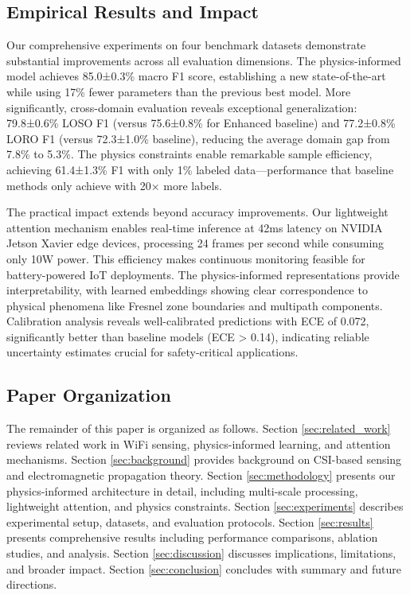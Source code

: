 \documentclass[10pt,journal,compsoc]{IEEEtran}
\begin{document}
\subsection{Empirical Results and Impact}

Our comprehensive experiments on four benchmark datasets demonstrate substantial improvements across all evaluation dimensions. The physics-informed model achieves 85.0±0.3\% macro F1 score, establishing a new state-of-the-art while using 17\% fewer parameters than the previous best model. More significantly, cross-domain evaluation reveals exceptional generalization: 79.8±0.6\% LOSO F1 (versus 75.6±0.8\% for Enhanced baseline) and 77.2±0.8\% LORO F1 (versus 72.3±1.0\% baseline), reducing the average domain gap from 7.8\% to 5.3\%. The physics constraints enable remarkable sample efficiency, achieving 61.4±1.3\% F1 with only 1\% labeled data—performance that baseline methods only achieve with 20× more labels.

The practical impact extends beyond accuracy improvements. Our lightweight attention mechanism enables real-time inference at 42ms latency on NVIDIA Jetson Xavier edge devices, processing 24 frames per second while consuming only 10W power. This efficiency makes continuous monitoring feasible for battery-powered IoT deployments. The physics-informed representations provide interpretability, with learned embeddings showing clear correspondence to physical phenomena like Fresnel zone boundaries and multipath components. Calibration analysis reveals well-calibrated predictions with ECE of 0.072, significantly better than baseline models (ECE > 0.14), indicating reliable uncertainty estimates crucial for safety-critical applications.

\subsection{Paper Organization}

The remainder of this paper is organized as follows. Section \ref{sec:related_work} reviews related work in WiFi sensing, physics-informed learning, and attention mechanisms. Section \ref{sec:background} provides background on CSI-based sensing and electromagnetic propagation theory. Section \ref{sec:methodology} presents our physics-informed architecture in detail, including multi-scale processing, lightweight attention, and physics constraints. Section \ref{sec:experiments} describes experimental setup, datasets, and evaluation protocols. Section \ref{sec:results} presents comprehensive results including performance comparisons, ablation studies, and analysis. Section \ref{sec:discussion} discusses implications, limitations, and broader impact. Section \ref{sec:conclusion} concludes with summary and future directions.
\end{document}
